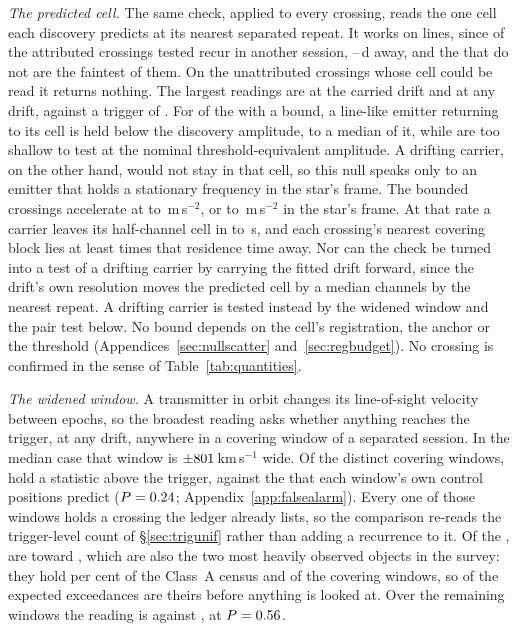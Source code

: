 \emph{The predicted cell.} The same check, applied to every crossing, reads
the one cell each discovery predicts at its nearest separated repeat. It
works on lines, since \MkAttrRecur{} of the \MkAttrTested{} attributed
crossings tested recur in another session, \QcSepMinD--\QcSepMaxD\,d away, and the
\MkAttrExcl{} that do not are the faintest of them. On the \RcNExclPoss{}
unattributed crossings whose cell could be read it returns nothing. The
largest readings are \RcTMatched{} at the carried drift and \RcTMax{} at any
drift, against a trigger of \StageNullTrig. For \RcNFracBelow{} of the \RcNExcl{} with a
bound, a line-like emitter returning to its cell is held below the discovery
amplitude, to a median \RcFracMed{} of it, while \HjNPowerLo{} are too
shallow to test at the nominal threshold-equivalent amplitude. A drifting
carrier, on the other hand, would not stay in that cell, so this null speaks
only to an emitter that holds a stationary frequency in the star's frame. The
bounded crossings
accelerate at \ZtALosLo{} to \ZtALosHi\,m\,s$^{-2}$, or \EgExStarALosLo{} to
\EgStarALosHi\,m\,s$^{-2}$ in the star's frame. At that rate a carrier leaves its
half-channel cell in \ZtLeaveSecLo{} to \ZtLeaveSecHi\,s, and each
crossing's nearest covering block lies at least \ZtGapOverLeaveMin{} times
that residence time away. Nor can the check be turned into a test of a
drifting carrier by carrying the fitted drift forward, since the drift's own
resolution moves the predicted cell by a median \ZtRegChanMed{} channels by
the nearest repeat. A drifting carrier is tested instead by the widened
window and the pair test below. No bound depends on the
cell's registration, the anchor or the threshold
(Appendices~\ref{sec:nullscatter} and~\ref{sec:regbudget}).
\RcNoRepeatSentence{} No crossing is confirmed in the sense of
Table~\ref{tab:quantities}.

\emph{The widened window.} A transmitter in orbit changes its line-of-sight
velocity between epochs, so the broadest reading asks whether anything
reaches the trigger, at any drift, anywhere in a covering window of a
separated session. In the median case that window is
$\pm801$\,km\,s$^{-1}$ wide. Of the \WuNWin{} distinct covering
windows, \WuNWinExc{} hold a statistic above the trigger, against the
\WuExpWinCtrl{} that each window's own control positions predict
($P=0.24$; Appendix~\ref{app:falsealarm}). Every one of those
windows holds a crossing the ledger already lists, so the comparison
re-reads the trigger-level count of \S\ref{sec:trigunif} rather than adding
a recurrence to it. Of the \WuNWinExc, \WuNWinExcTwo{} are toward
\WuTwoStars, which are also the two most heavily observed objects in the
survey: they hold \TwWinASharePct{} per cent of the Class~A census and
\TwNWinTwo{} of the \WuNWin{} covering windows, so \TwExpTwoCtrl{} of the
\WuExpWinCtrl{} expected exceedances are theirs before anything is looked
at. Over the remaining \WuNWinRest{} windows the reading is
\WuNWinRestExc{} against \WuExpRestCtrl, at $P=0.56$.

